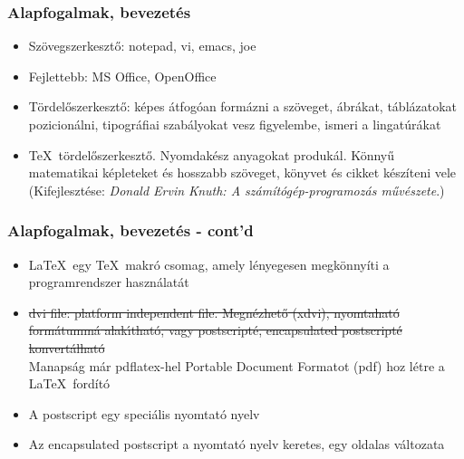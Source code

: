 \documentclass[t,aspectratio=169]{beamer}
\begin{document}
\begin{frame}
\frametitle{Alapfogalmak, bevezetés}
\begin{itemize}
\setlength{\parskip}{0pt}
\item Szövegszerkesztő: notepad, vi, emacs, joe
\item Fejlettebb: MS Office, OpenOffice
\item Tördelőszerkesztő: képes átfogóan formázni a szö\-ve\-get, ábrákat, táblázatokat pozicionálni, tipográfiai sza\-bá\-lyo\-kat vesz figyelembe, ismeri a lingatúrákat
\item \TeX\ tördelőszerkesztő. Nyomdakész anyagokat produkál. Könnyű matematikai képleteket és hosszabb szöveget, könyvet és cikket készíteni vele (Kifejlesztése: \textit{Donald Ervin Knuth: A számítógép-prog\-ra\-mo\-zás művészete}.)
\end{itemize}
\end{frame}


\begin{frame}
\frametitle{Alapfogalmak, bevezetés - cont'd}
\begin{itemize}
\setlength{\parskip}{0pt}
\item \LaTeX\ egy \TeX\ makró csomag, amely lényegesen megkönnyíti a programrendszer használatát
\item \st{dvi file: platform independent file. Megn{\'e}zhet{\H{o}} (xdvi), nyomtahat{\'o} form{\'a}tumm{\'a} alak{\'\i}that{\'o}, vagy postscript{\'e}, encapsulated postscript{\'e} konvert{\'a}lhat{\'o}}\\Manapság már pdflatex-hel Portable Document Formatot (pdf) hoz létre a \LaTeX\ fordító
\item A postscript egy speciális nyomtató nyelv
\item Az encapsulated postscript a nyomtató nyelv keretes, egy oldalas változata
\end{itemize}
\end{frame}

\end{document}
